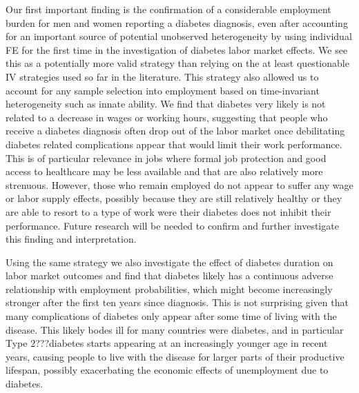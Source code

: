 \documentclass[12pt,english,british]{article}
\begin{document}
Our first important finding is the confirmation of a considerable employment burden for men and women reporting a diabetes diagnosis, even after accounting for an important source of potential unobserved heterogeneity by using individual \ac{FE} for the first time in the investigation of diabetes labor market effects. We see this as a potentially more valid strategy than relying on the at least questionable \ac{IV} strategies used so far in the literature. This strategy also allowed us to account for any sample selection into employment based on time-invariant heterogeneity such as innate ability. We find that diabetes very likely is not related to a decrease in wages or working hours, suggesting that people who receive a diabetes diagnosis often drop out of the labor market once debilitating diabetes related complications appear that would limit their work performance. This is of particular relevance in jobs where formal job protection and good access to healthcare may be less available and that are also relatively more strenuous. However, those who remain employed do not appear to suffer any wage or labor supply effects, possibly because they are still relatively healthy or they are able to resort to a type of work were their diabetes does not inhibit their performance. Future research will be needed to confirm and further investigate this finding and interpretation.

Using the same strategy we also investigate the effect of diabetes duration on labor market outcomes and find that diabetes likely has a continuous adverse relationship with employment probabilities, which might become increasingly stronger after the first ten years since diagnosis. This is not surprising given that many complications of diabetes only appear after some time of living with the disease. This likely bodes ill for many countries were diabetes, and in particular Type 2???diabetes starts appearing at an increasingly younger age in recent years, causing people to live with the disease for larger parts of their productive lifespan, possibly exacerbating the economic effects of unemployment due to diabetes. 
\end{document}
